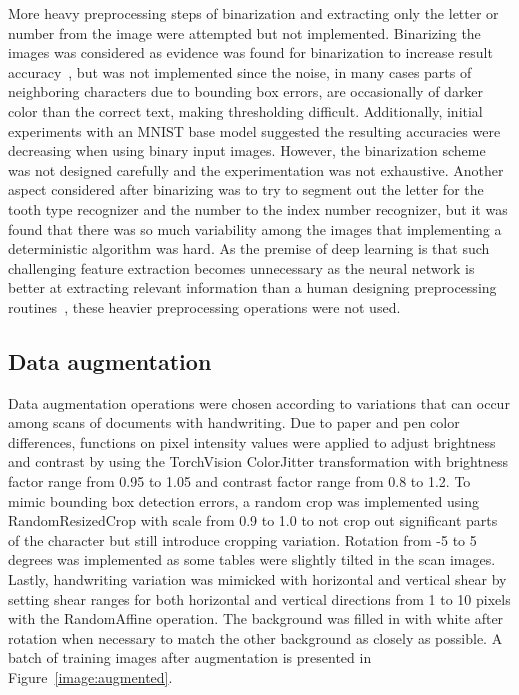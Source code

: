 \documentclass[english,twoside,openright]{UH_DS_MSc}
\begin{document}
More heavy preprocessing steps of binarization and extracting only the letter or number from the image were 
attempted but not implemented.
Binarizing the images was considered as evidence was found for binarization to increase result accuracy~\cite{9thuonPalm},
but was not implemented since the noise, in many cases
 parts of neighboring characters due to bounding box errors, are occasionally of darker 
color than the correct text, making thresholding difficult. Additionally,
 initial experiments with an MNIST base model suggested the resulting
accuracies were decreasing when using binary input images. However, the binarization scheme was not designed carefully 
and the experimentation was not exhaustive.
Another aspect considered after binarizing was to try to segment out the letter for the tooth type recognizer 
and the number to the index number recognizer, but it was found that there was so much variability 
among the images that implementing a deterministic algorithm was hard. 
As the premise of deep learning is that such challenging feature extraction becomes unnecessary as the neural 
network is better at extracting relevant information than a human designing preprocessing routines~\cite{princebook}, these 
heavier preprocessing operations were not used.

\subsection{Data augmentation}
\label{sect:aug}

Data augmentation operations were chosen according to variations that can 
occur among scans of documents with handwriting.
Due to paper and pen color differences, functions on pixel intensity
values were applied to adjust brightness and contrast by using the 
TorchVision ColorJitter transformation with brightness factor range from 
0.95 to 1.05 and contrast factor range from 0.8 to 1.2. To mimic bounding box detection errors, 
a random crop was implemented using RandomResizedCrop with 
scale from 0.9 to 1.0 to not crop out significant parts of the character but 
still introduce cropping variation. Rotation from -5 to 5 degrees 
was implemented as some tables were slightly tilted in the scan images. 
Lastly, handwriting variation was mimicked with horizontal and vertical 
shear by setting shear ranges for both horizontal and vertical directions from 1 
to 10 pixels with the RandomAffine operation. The background was filled in 
with white after rotation when necessary to match the other background as closely as possible.
 A batch of training images after augmentation
is presented in Figure~\ref{image:augmented}.
\end{document}
